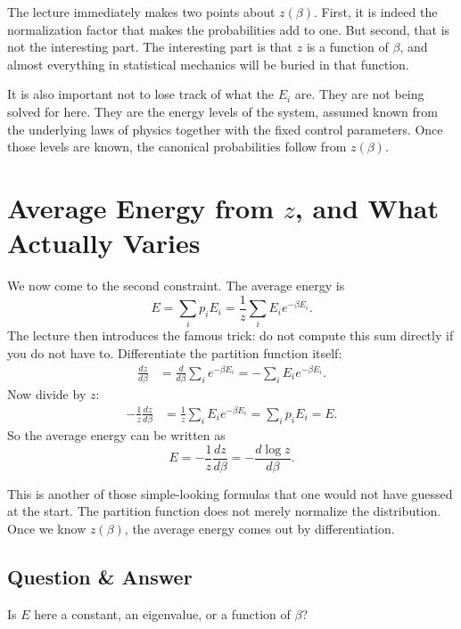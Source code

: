 The lecture immediately makes two points about \(z(\beta)\). First, it is indeed the normalization factor that makes the probabilities add to one. But second, that is not the interesting part. The interesting part is that \(z\) is a function of \(\beta\), and almost everything in statistical mechanics will be buried in that function.

It is also important not to lose track of what the \(E_i\) are. They are not being solved for here. They are the energy levels of the system, assumed known from the underlying laws of physics together with the fixed control parameters. Once those levels are known, the canonical probabilities follow from \(z(\beta)\).

\section{Average Energy from \(z\), and What Actually Varies}

We now come to the second constraint. The average energy is
\begin{equation}
E=\sum_i p_i E_i=\frac{1}{z}\sum_i E_i e^{-\beta E_i}.
\end{equation}
The lecture then introduces the famous trick: do not compute this sum directly if you do not have to. Differentiate the partition function itself:
\begin{align}
\frac{dz}{d\beta}
&=
\frac{d}{d\beta}\sum_i e^{-\beta E_i}
=
-\sum_i E_i e^{-\beta E_i}.
\end{align}
Now divide by \(z\):
\begin{align}
-\frac{1}{z}\frac{dz}{d\beta}
&=
\frac{1}{z}\sum_i E_i e^{-\beta E_i}
=
\sum_i p_i E_i
=
E.
\end{align}
So the average energy can be written as
\begin{equation}
E=-\frac{1}{z}\frac{dz}{d\beta}
=-\frac{d\log z}{d\beta}.
\end{equation}

This is another of those simple-looking formulas that one would not have guessed at the start. The partition function does not merely normalize the distribution. Once we know \(z(\beta)\), the average energy comes out by differentiation.

\subsection{Question \& Answer}

Is \(E\) here a constant, an eigenvalue, or a function of \(\beta\)?

